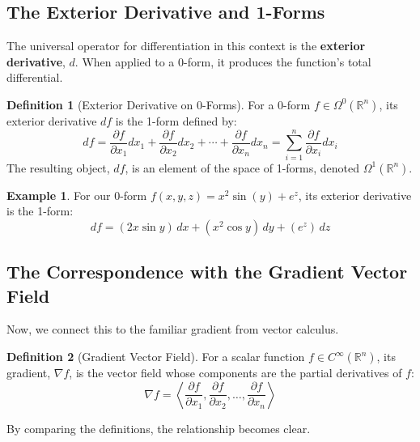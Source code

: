 \documentclass[12pt, letterpaper]{article}
\theoremstyle{definition}
\newtheorem{defn}{Definition}[section]
\newtheorem{exmp}{Example}[section]
\begin{document}
	\subsection{The Exterior Derivative and 1-Forms}
	The universal operator for differentiation in this context is the \textbf{exterior derivative}, $d$. When applied to a 0-form, it produces the function's total differential.
	
	\begin{defn}[Exterior Derivative on 0-Forms]
		For a 0-form $f \in \Omega^0(\mathbb{R}^n)$, its exterior derivative $df$ is the 1-form defined by:
		\begin{equation*}
			df = \frac{\partial f}{\partial x_1} dx_1 + \frac{\partial f}{\partial x_2} dx_2 + \cdots + \frac{\partial f}{\partial x_n} dx_n = \sum_{i=1}^n \frac{\partial f}{\partial x_i} dx_i
		\end{equation*}
		The resulting object, $df$, is an element of the space of 1-forms, denoted $\Omega^1(\mathbb{R}^n)$.
	\end{defn}
	
	\begin{exmp}
		For our 0-form $f(x, y, z) = x^2 \sin(y) + e^z$, its exterior derivative is the 1-form:
		\begin{equation*}
			df = (2x \sin y) \, dx + (x^2 \cos y) \, dy + (e^z) \, dz
		\end{equation*}
	\end{exmp}
	
	\subsection{The Correspondence with the Gradient Vector Field}
	Now, we connect this to the familiar gradient from vector calculus.
	
	\begin{defn}[Gradient Vector Field]
		For a scalar function $f \in C^\infty(\mathbb{R}^n)$, its gradient, $\nabla f$, is the vector field whose components are the partial derivatives of $f$:
		\begin{equation*}
			\nabla f = \left\langle \frac{\partial f}{\partial x_1}, \frac{\partial f}{\partial x_2}, \dots, \frac{\partial f}{\partial x_n} \right\rangle
		\end{equation*}
	\end{defn}
	
	By comparing the definitions, the relationship becomes clear.
	
\end{document}
